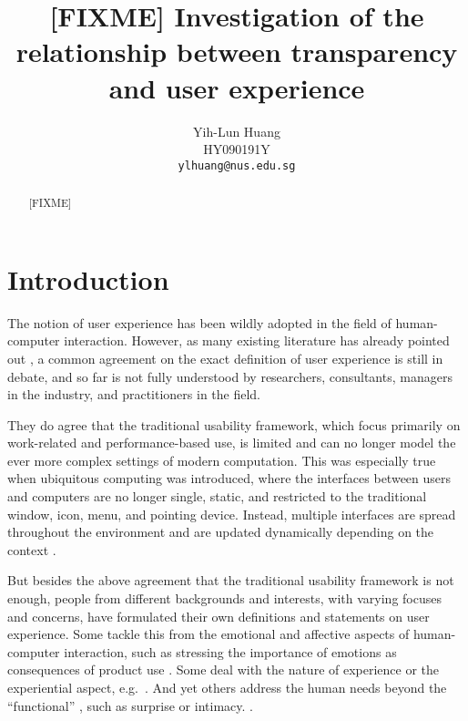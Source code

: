 \documentclass[a4paper,titlepage]{article}
\begin{document}
\title{[FIXME] Investigation of the relationship between transparency
  and user experience}
\author{Yih-Lun Huang\\
HY090191Y\\
\texttt{ylhuang@nus.edu.sg}}
\maketitle


\begin{abstract}
[FIXME]
\end{abstract}


\tableofcontents
\newpage


\section{Introduction}
\label{sec:introduction}
The notion of user experience has been wildly adopted in the field of
human-computer interaction. However, as many existing literature has
already pointed out \citep{ux:hassenzahl, ux:law}, a common agreement
on the exact definition of user experience is still in debate, and so
far is not fully understood by researchers, consultants, managers in
the industry, and practitioners in the field.

They do agree that the traditional usability framework, which focus
primarily on work-related and performance-based use, is limited and
can no longer model the ever more complex settings of modern
computation. This was especially true when ubiquitous computing was
introduced, where the interfaces between users and computers are no
longer single, static, and restricted to the traditional window, icon,
menu, and pointing device. Instead, multiple interfaces are spread
throughout the environment and are updated dynamically depending on
the context \citep{windows:bolter}.

But besides the above agreement that the traditional usability
framework is not enough, people from different backgrounds and
interests, with varying focuses and concerns, have formulated their
own definitions and statements on user experience. Some tackle this
from the emotional and affective aspects of human-computer
interaction, such as stressing the importance of emotions as
consequences of product use \citep{emotions:desmet}. Some deal with
the nature of experience or the experiential aspect,
e.g.\ \citet{experience:forlizzi}. And yet others address the human
needs beyond the ``functional'' \citep{emotional:norman}, such as
surprise or intimacy. \citep{alternatives:gaver}.
\end{document}
